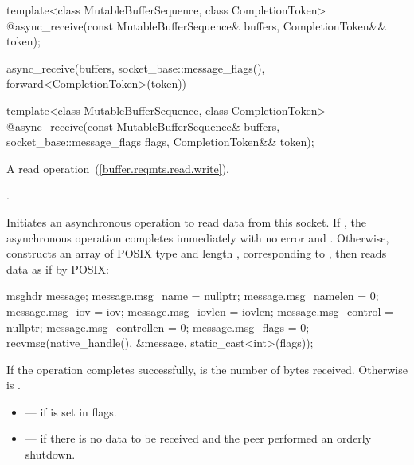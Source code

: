 \begin{itemdecl}
template<class MutableBufferSequence, class CompletionToken>
  @\DEDUCED@ async_receive(const MutableBufferSequence& buffers,
                        CompletionToken&& token);
\end{itemdecl}

\begin{itemdescr}
\pnum
\returns
\begin{codeblock}
async_receive(buffers, socket_base::message_flags(), forward<CompletionToken>(token))
\end{codeblock}
\end{itemdescr}

\begin{itemdecl}
template<class MutableBufferSequence, class CompletionToken>
  @\DEDUCED@ async_receive(const MutableBufferSequence& buffers,
                        socket_base::message_flags flags,
                        CompletionToken&& token);
\end{itemdecl}

\begin{itemdescr}
\pnum
A read operation~(\ref{buffer.reqmts.read.write}).

\pnum
\completionsig {}.

\pnum
\effects Initiates an asynchronous operation to read data from this socket. If , the asynchronous operation completes immediately with no error and . Otherwise, constructs an array  of POSIX type  and length , corresponding to , then reads data as if by POSIX:
\begin{codeblock}
msghdr message;
message.msg_name = nullptr;
message.msg_namelen = 0;
message.msg_iov = iov;
message.msg_iovlen = iovlen;
message.msg_control = nullptr;
message.msg_controllen = 0;
message.msg_flags = 0;
recvmsg(native_handle(), &message, static_cast<int>(flags));
\end{codeblock}


\pnum
If the operation completes successfully,  is the number of bytes received. Otherwise  is .

\pnum
\errors
\begin{itemize}
\item
{} --- if  is set in flags.
\item
{} --- if there is no data to be received and the peer performed an orderly shutdown.
\end{itemize}
\end{itemdescr}

